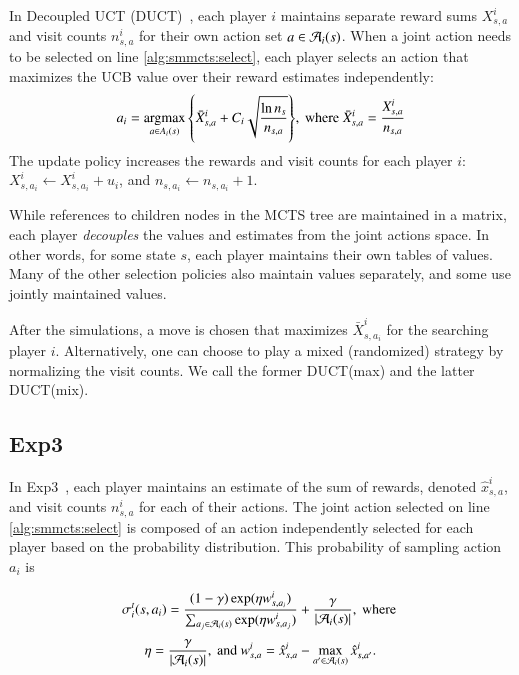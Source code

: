 In Decoupled UCT (DUCT)~\cite{Cadiaplayer}, each player $i$ maintains separate reward sums $X^i_{s,a}$ and visit
counts $n^i_{s,a}$ for their own action set $a \in \mathcal{A}_i(s)$.
When a joint action needs to be selected on line
\ref{alg:smmcts:select}, each player selects an action that maximizes the UCB value over their reward estimates independently:
\begin{equation}
a_i = \argmax_{a \in A_i(s)}{ \left\{ \bar{X}^i_{s,a} + C_i \sqrt{\frac{\ln n_s}{n_{s,a}}} \right\} }, 
  \mbox{ where } \bar{X}^i_{s,a} = \frac{X^i_{s,a}}{n_{s,a}}
\end{equation}
\noindent The update policy increases the rewards and visit counts for each player $i$: $X^i_{s,a_i} \leftarrow X^i_{s,a_i} + u_i$,
and $n_{s,a_i} \leftarrow n_{s,a_i} + 1$.

While references to children nodes in the MCTS tree are maintained in a matrix, each player {\it decouples} the values and estimates from the joint
actions space. In other words, for some state $s$, each player maintains their own tables of values. 
Many of the other selection policies also maintain values separately, and some use jointly
maintained values.

After the simulations, a move is chosen that maximizes $\bar{X}^i_{s,a_i}$ for the searching player $i$.
Alternatively, one can choose to play a mixed (\ie randomized) strategy by normalizing the visit counts.
We call the former DUCT(max) and the latter DUCT(mix).

\subsection{Exp3} \label{sec:exp3}

In Exp3~\cite{Exp3}, each player maintains an estimate of the sum of rewards, denoted $\hat{x}^i_{s,a}$, and visit counts $n^i_{s,a}$ for each of their actions.
The joint action selected on line \ref{alg:smmcts:select} is composed of an action independently selected for each player based on the probability
distribution. This probability of sampling action $a_i$ is

\begin{equation}
\label{eq:exp3select}
\sigma^t_i(s,a_i) = \frac{(1-\gamma) \exp(\eta w^i_{s,a_i})}{\sum_{a_j \in \mathcal{A}_i(s)} \exp(\eta w^i_{s,a_j})} + \frac{\gamma}{|\mathcal{A}_i(s)|}, \mbox{ where }
\end{equation}
\[ \eta = \frac{\gamma}{|\mathcal{A}_i(s)|}, \mbox{ and } w^i_{s,a} = \hat{x}^i_{s,a} - \max_{a' \in \mathcal{A}_i(s)} \hat{x}^i_{s,a'}. \]

